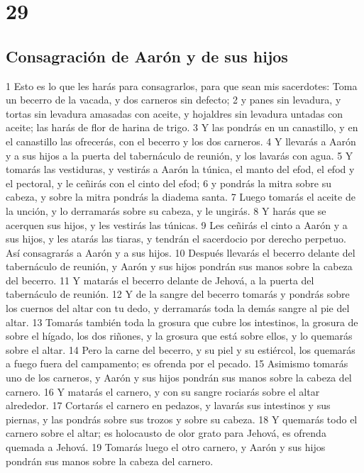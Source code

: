 \chapter{29}

\section{Consagración de Aarón y de sus hijos}

1 Esto es lo que les harás para consagrarlos, para que sean mis sacerdotes: Toma un becerro de la vacada, y dos carneros sin defecto;
2 y panes sin levadura, y tortas sin levadura amasadas con aceite, y hojaldres sin levadura untadas con aceite; las harás de flor de harina de trigo.
3 Y las pondrás en un canastillo, y en el canastillo las ofrecerás, con el becerro y los dos carneros.
4 Y llevarás a Aarón y a sus hijos a la puerta del tabernáculo de reunión, y los lavarás con agua.
5 Y tomarás las vestiduras, y vestirás a Aarón la túnica, el manto del efod, el efod y el pectoral, y le ceñirás con el cinto del efod;
6 y pondrás la mitra sobre su cabeza, y sobre la mitra pondrás la diadema santa.
7 Luego tomarás el aceite de la unción, y lo derramarás sobre su cabeza, y le ungirás.
8 Y harás que se acerquen sus hijos, y les vestirás las túnicas.
9 Les ceñirás el cinto a Aarón y a sus hijos, y les atarás las tiaras, y tendrán el sacerdocio por derecho perpetuo. Así consagrarás a Aarón y a sus hijos.
10 Después llevarás el becerro delante del tabernáculo de reunión, y Aarón y sus hijos pondrán sus manos sobre la cabeza del becerro.
11 Y matarás el becerro delante de Jehová, a la puerta del tabernáculo de reunión.
12 Y de la sangre del becerro tomarás y pondrás sobre los cuernos del altar con tu dedo, y derramarás toda la demás sangre al pie del altar.
13 Tomarás también toda la grosura que cubre los intestinos, la grosura de sobre el hígado, los dos riñones, y la grosura que está sobre ellos, y lo quemarás sobre el altar.
14 Pero la carne del becerro, y su piel y su estiércol, los quemarás a fuego fuera del campamento; es ofrenda por el pecado.
15 Asimismo tomarás uno de los carneros, y Aarón y sus hijos pondrán sus manos sobre la cabeza del carnero.
16 Y matarás el carnero, y con su sangre rociarás sobre el altar alrededor.
17 Cortarás el carnero en pedazos, y lavarás sus intestinos y sus piernas, y las pondrás sobre sus trozos y sobre su cabeza.
18 Y quemarás todo el carnero sobre el altar; es holocausto de olor grato  para Jehová, es ofrenda quemada a Jehová.
19 Tomarás luego el otro carnero, y Aarón y sus hijos pondrán sus manos sobre la cabeza del carnero.
